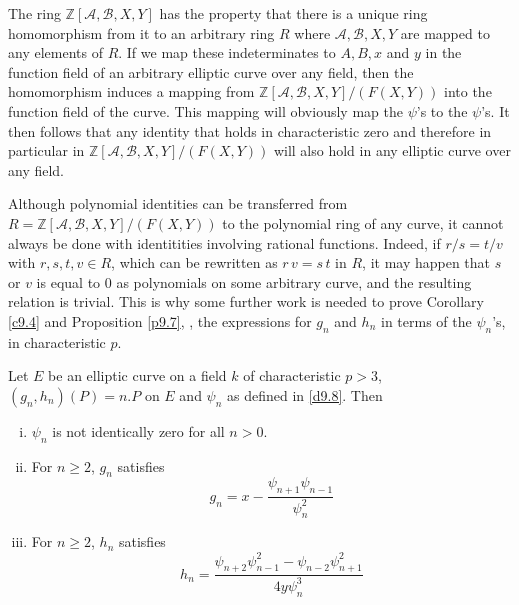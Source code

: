 The ring $\mathbb{Z}[\mathcal{A},\mathcal{B},X,Y]$ has the property that there is a unique ring homomorphism from it to an arbitrary ring $R$ where $\mathcal{A},\mathcal{B},X,Y$ are mapped to any elements of $R$. If we map these indeterminates to $A,B,x$ and $y$ in the function field of an arbitrary elliptic curve over any field, then the homomorphism induces a mapping from $\mathbb{Z}[\mathcal{A},\mathcal{B},X,Y]/(F(X,Y))$ into the function field of the curve. This mapping will obviously map the $\psi$'s to the $\psi$'s. It then follows that any identity that holds in characteristic zero and therefore in particular in $\mathbb{Z}[\mathcal{A},\mathcal{B},X,Y]/(F(X,Y))$ will also hold in any elliptic curve over any field.

Although polynomial identities can be transferred from $R=\mathbb{Z}[\mathcal{A},\mathcal{B},X,Y]/(F(X,Y))$ to the polynomial ring of any curve, it cannot always be done with identitities involving rational functions. Indeed, if $r/s=t/v$ with $r,s,t,v \in R$, which can be rewritten as $r\, v=s\, t$ in $R$, it may happen that $s$ or $v$ is equal to 0 as polynomials on some arbitrary curve, and the resulting relation is trivial. This is why some further work is needed to prove Corollary \ref{c9.4} and Proposition \ref{p9.7}, \ie, the expressions for $g_{n}$ and $h_{n}$ in terms of the $\psi_{n}$'s, in characteristic $p$.

\begin{theo}
\label{t9.9}
Let $E$ be an elliptic curve on a field $k$ of characteristic $p>3$, $(g_n,h_n)(P)=n. P$ on $E$ and $\psi_n$ as defined in \ref{d9.8}. Then
\begin{enumerate}[(i)]
\item
$\psi_{n}$ is not identically zero for all $n>0$.
\item
For $n \geq 2$, $g_{n}$ satisfies
\begin{equation}
\label{eq1.25}
g_{n}=x-\displaystyle \frac{\psi_{n+1}\psi_{n-1}}{\psi_{n}^{2}}
\end{equation}
\item
For $n \geq 2$, $h_{n}$ satisfies
\begin{equation}
\label{eq1.26}
h_{n}=\displaystyle \frac{\psi_{n+2}\psi_{n-1}^{2}-\psi_{n-2}\psi_{n+1}^{2}}{4y\psi_{n}^{3}}
\end{equation}
\end{enumerate}
\end{theo}


